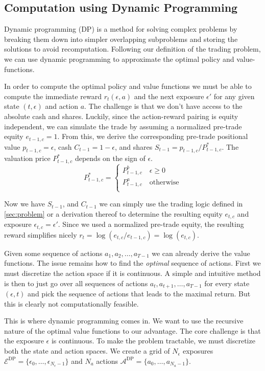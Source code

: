 \subsection{Computation using Dynamic Programming}

Dynamic programming (DP) is a method for solving complex problems by breaking them down into simpler overlapping subproblems and storing the solutions to avoid recomputation. Following our definition of the trading problem, we can use dynamic programming to approximate the optimal policy and value-functions.

In order to compute the optimal policy and value functions we must be able to compute the immediate reward $r_t(\epsilon, a)$ and the next exposure $\epsilon'$ for any given state $(t,\epsilon)$ and action $a$. The challenge is that we don't have access to the absolute cash and shares. Luckily, since the action-reward pairing is equity independent, we can simulate the trade by assuming a normalized pre-trade equity $e_{t-1,c} = 1$. From this, we derive the corresponding pre-trade positional value $p_{t-1,c} = \epsilon$, cash $C_{t-1} = 1 - \epsilon$, and shares $S_{t-1} = p_{t-1,c} / P_{t-1,c}^*$. The valuation price $P_{t-1,c}^*$ depends on the sign of $\epsilon$. 
$$
P_{t-1,c}^* = \begin{cases}
P^b_{t-1,c}\quad \epsilon \ge 0\\
P^a_{t-1,c}\quad \text{otherwise}\\
\end{cases}
$$

Now we have $S_{t-1}$, and $C_{t-1}$ we can simply use the trading logic defined in \cref{sec:problem} or a derivation thereof to determine the resulting equity $e_{t,c}$ and exposure $\epsilon_{t,c} = \epsilon'$. Since we used a normalized pre-trade equity, the resulting reward simplifies nicely $r_t = \log(e_{t,c} / e_{t-1,c}) = \log(e_{t,c})$. 

Given some sequence of actions $a_1, a_2, \dots, a_{T-1}$ we can already derive the value functions. The issue remains how to find the \textit{optimal} sequence of actions. First we must discretize the action space if it is continuous. A simple and intuitive method is then to just go over all sequences of actions $a_t, a_{t+1}, \dots, a_{T-1}$ for every state $(\epsilon, t)$ and pick the sequence of actions that leads to the maximal return. But this is clearly not computationally feasible. 

This is where dynamic programming comes in. We want to use the recursive nature of the optimal value functions to our advantage. The core challenge is that the exposure $\epsilon$ is continuous. To make the problem tractable, we must discretize both the state and action spaces. We create a grid of $N_\epsilon$ exposures $\mathcal{E}^\text{DP}=\{\epsilon_0,\dots,\epsilon_{N_\epsilon-1}\}$ and $N_a$ actions $\mathcal{A}^{\text{DP}}=\{a_0,\dots,a_{N_a-1}\}$. 

